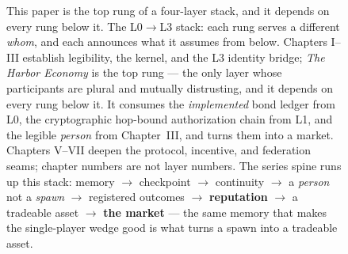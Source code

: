 \begin{figure}[H]
{%
}
\caption{This paper is the top rung of a four-layer stack, and it depends on
every rung below it. The L0$\to$L3 stack: each rung serves
a different \emph{whom}, and each announces what it assumes from below. Chapters
I--III establish legibility, the kernel, and the L3 identity bridge; \emph{The Harbor
Economy} is the top rung --- the only layer whose participants are plural and
mutually distrusting, and it depends on every rung below it. It consumes the
\emph{implemented} bond ledger from L0, the cryptographic hop-bound authorization
chain from L1, and the legible \emph{person} from Chapter~III, and turns them into a
market. Chapters V--VII deepen the protocol, incentive, and federation seams;
chapter numbers are not layer numbers. The series spine runs up this stack: memory $\to$ checkpoint
$\to$ continuity $\to$ a \emph{person} not a \emph{spawn} $\to$ registered outcomes
$\to$ \textbf{reputation} $\to$ a tradeable asset $\to$ \textbf{the market} --- the
same memory that makes the single-player wedge good is what turns a spawn into a
tradeable asset.}
\label{fig:he-stack-map}
\end{figure}
